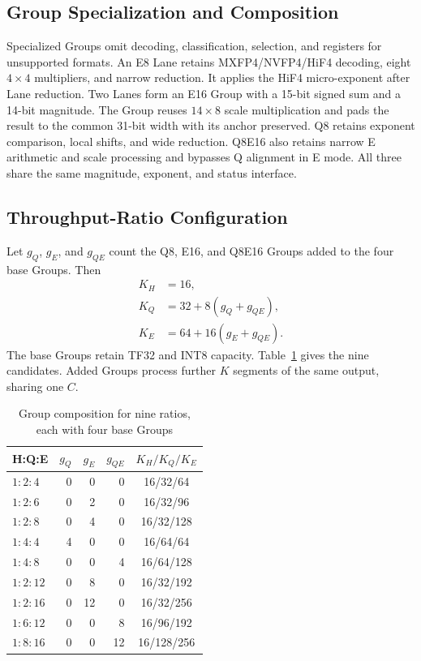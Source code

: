 \documentclass[conference,9pt,letterpaper]{IEEEtran}
\begin{document}
\subsection{Group Specialization and Composition}
\label{sec:specialized_midgroups}

Specialized Groups omit decoding, classification, selection, and registers for unsupported formats. An E8 Lane retains MXFP4/NVFP4/HiF4 decoding, eight $4\times4$ multipliers, and narrow reduction. It applies the HiF4 micro-exponent after Lane reduction. Two Lanes form an E16 Group with a 15-bit signed sum and a 14-bit magnitude. The Group reuses $14\times8$ scale multiplication and pads the result to the common 31-bit width with its anchor preserved. Q8 retains exponent comparison, local shifts, and wide reduction. Q8E16 also retains narrow E arithmetic and scale processing and bypasses Q alignment in E mode. All three share the same magnitude, exponent, and status interface.

\subsection{Throughput-Ratio Configuration}
\label{sec:expansion}

Let $g_Q$, $g_E$, and $g_{QE}$ count the Q8, E16, and Q8E16 Groups added to the four base Groups. Then
\begin{equation}
\begin{aligned}
K_H&=16,\\
K_Q&=32+8(g_Q+g_{QE}),\\
K_E&=64+16(g_E+g_{QE}).
\end{aligned}
\label{eq:group_capacity}
\end{equation}
The base Groups retain TF32 and INT8 capacity. Table~\ref{tab:ratio9_composition} gives the nine candidates. Added Groups process further $K$ segments of the same output, sharing one $C$.

\begin{table}[t]
\centering
\caption{Group composition for nine ratios, each with four base Groups}
\label{tab:ratio9_composition}
\footnotesize
\begin{tabular}{@{}lrrrc@{}}\toprule
H:Q:E & $g_Q$ & $g_E$ & $g_{QE}$ & $K_H/K_Q/K_E$ \\\midrule
$1:2:4$ & 0 & 0 & 0 & 16/32/64 \\
$1:2:6$ & 0 & 2 & 0 & 16/32/96 \\
$1:2:8$ & 0 & 4 & 0 & 16/32/128 \\
$1:4:4$ & 4 & 0 & 0 & 16/64/64 \\
$1:4:8$ & 0 & 0 & 4 & 16/64/128 \\
$1:2:12$ & 0 & 8 & 0 & 16/32/192 \\
$1:2:16$ & 0 & 12 & 0 & 16/32/256 \\
$1:6:12$ & 0 & 0 & 8 & 16/96/192 \\
$1:8:16$ & 0 & 0 & 12 & 16/128/256 \\
\bottomrule\end{tabular}
\end{table}
\end{document}
